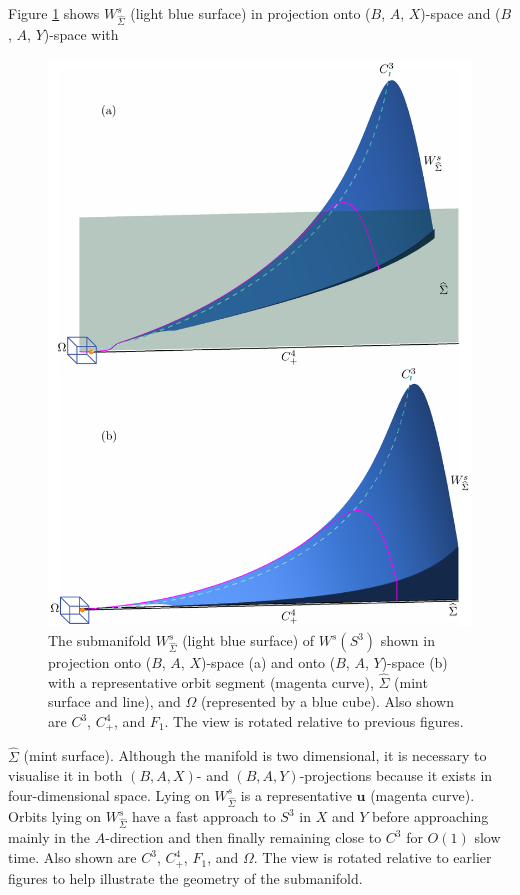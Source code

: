 \documentclass{ws-ijbc}
\begin{document}
Figure \ref{figure_4} shows $W^s_{\widehat{\Sigma}}$ (light blue surface) in projection onto ($B$, $A$, $X$)-space and ($B$, $A$, $Y$)-space with 

\begin{figure}[H]
\centering
\includegraphics[]{./figures/MKMO_4.pdf}
\caption{The submanifold $W^{s}_{\widehat{\Sigma}}$ (light blue surface) of $W^s(S^3)$ shown in projection onto ($B$, $A$, $X$)-space (a) and onto ($B$, $A$, $Y$)-space (b) with a representative orbit segment (magenta curve), $\widehat{\Sigma}$ (mint surface and line), and $\Omega$ (represented by a blue cube).  Also shown are $C^3$, $C^4_+$, and $F_1$.  The view is rotated relative to previous figures.}
\label{figure_4}
\end{figure}

\noindent
$\widehat{\Sigma}$ (mint surface).  Although the manifold is two dimensional, it is necessary to visualise it in both $(B,A,X)$- and $(B,A,Y)$-projections because it exists in four-dimensional space.  Lying on $W^s_{\widehat{\Sigma}}$ is a representative $\mathbf{u}$ (magenta curve).  Orbits lying on $W^s_{\widehat{\Sigma}}$ have a fast approach to $S^3$ in $X$ and $Y$ before approaching mainly in the $A$-direction and then finally remaining close to $C^3$ for $O(1)$ slow time.  Also shown are $C^3$, $C^4_+$, $F_1$, and $\Omega$.  The view is rotated relative to earlier figures to help illustrate the geometry of the submanifold.
\end{document}
